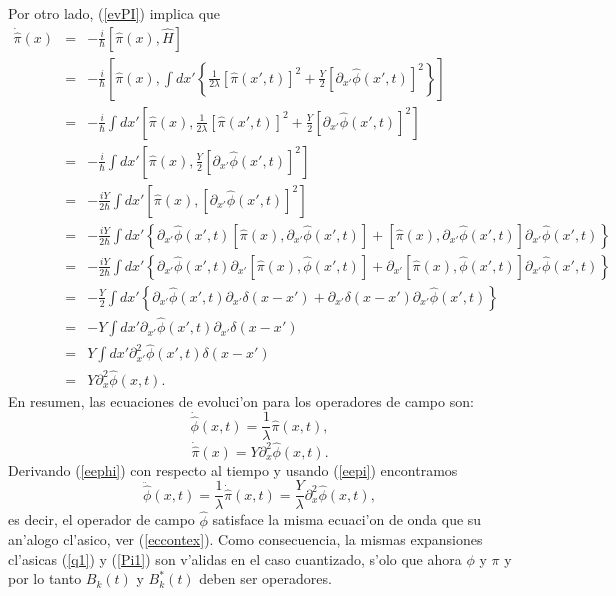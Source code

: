 Por otro lado, (\ref{evPI}) implica que
\begin{eqnarray}
\dot{\hat{\pi}}(x) & = &-\frac{i}{\hbar}\left[\hat{\pi}(x),\hat{H} \right] \\
& = &-\frac{i}{\hbar}\left[\hat{\pi}(x), \int dx'\left\{
\frac{1}{2\lambda}\left[ \hat{\pi}(x',t)\right]^2 +\frac{Y}{2}\left[
\partial_{x'} \hat{\phi} (x',t)\right]^2 \right\}\right]\\
& = &-\frac{i}{\hbar}\int dx'\left[\hat{\pi}(x), \frac{1}{2\lambda}\left[
\hat{\pi}(x',t)\right]^2 +\frac{Y}{2}\left[ \partial_{x'} \hat{\phi}
(x',t)\right]^2 \right]\\
& = &-\frac{i}{\hbar}\int dx'\left[\hat{\pi}(x), \frac{Y}{2}\left[ \partial_{x'}
\hat{\phi} (x',t)\right]^2 \right]\\
& = &-\frac{iY}{2\hbar}\int dx'\left[\hat{\pi}(x), \left[ \partial_{x'}
\hat{\phi}(x',t)\right]^2 \right]\\
& = &-\frac{iY}{2\hbar}\int dx'\left\lbrace \partial_{x'} \hat{\phi}
(x',t)\left[\hat{\pi}(x),  \partial_{x'} \hat{\phi} (x',t)\right]
+\left[\hat{\pi}(x),  \partial_{x'} \hat{\phi} (x',t)\right]\partial_{x'}
\hat{\phi} (x',t)\right\} \\
& = &-\frac{iY}{2\hbar}\int dx'\left\{ \partial_{x'} \hat{\phi}
(x',t)\partial_{x'}\left[\hat{\pi}(x),   \hat{\phi} (x',t)\right]
+\partial_{x'}\left[\hat{\pi}(x),  \hat{\phi} (x',t)\right]\partial_{x'}
\hat{\phi} (x',t)\right\} \\
& = &-\frac{Y}{2}\int dx'\left\{ \partial_{x'} \hat{\phi}
(x',t)\partial_{x'}\delta(x-x') +\partial_{x'}\delta(x-x')\partial_{x'}
\hat{\phi} (x',t)\right\}\\
& = &-Y\int dx' \partial_{x'} \hat{\phi} (x',t)\partial_{x'}\delta (x-x') \\
& = &Y\int dx' \partial^2_{x'} \hat{\phi} (x',t)\delta (x-x') \\
& = &Y\partial^2_{x} \hat{\phi} (x,t).
\end{eqnarray}
En resumen, las ecuaciones de evoluci'on para los operadores de campo son:
\begin{equation}
\dot{\hat{\phi}}(x,t)=\frac{1}{\lambda}\hat{\pi}(x,t), \label{eephi}
\end{equation}
\begin{equation}
\dot{\hat{\pi}}(x) =Y\partial^2_{x} \hat{\phi} (x,t).\label{eepi}
\end{equation}
Derivando (\ref{eephi}) con respecto al tiempo y usando  (\ref{eepi})
encontramos
 \begin{equation}
\ddot{\hat{\phi}}(x,t)=\frac{1}{\lambda}\dot{\hat{\pi}}(x,t)=\frac{Y}{\lambda}
\partial^2_{x} \hat{\phi} (x,t) ,
\end{equation}
es decir, el operador de campo $\hat\phi$ satisface la misma ecuaci'on de onda
que su an'alogo cl'asico, ver  (\ref{eccontex}).
Como consecuencia, la mismas expansiones cl'asicas (\ref{q1}) y (\ref{Pi1}) son
v'alidas en el caso cuantizado, s'olo que ahora $\phi$ y $\pi$ y por lo tanto
$B_k(t) $ y $B_k^{\ast}(t) $ deben ser operadores.


